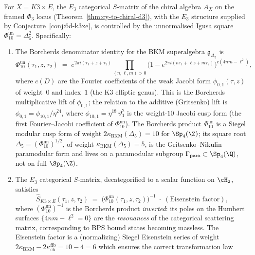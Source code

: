 \begin{conjecture}
\label{conj:s-matrix-phi10}
\ClaimStatusConjectured
For $X = K3 \times E$, the $E_3$ categorical $S$-matrix of the
chiral algebra $A_X$ on the framed $\Phi_3$ locus
\textup{(}Theorem~\textup{\ref{thm:cy-to-chiral-d3}}\textup{)}, with
the $E_3$ structure supplied by Conjecture~\textup{\ref{conj:6d-k3xe}},
is controlled by the
unnormalised Igusa square $\Phi_{10}^{\mathrm{un}}=\Delta_5^2$.
Specifically:
\begin{enumerate}[label=\textup{(\roman*)}]
 \item The Borcherds denominator identity for the BKM superalgebra
 $\mathfrak{g}_{\Delta_5}$ is
 \[
 \Phi_{10}^{\mathrm{un}}(\tau_1, z, \tau_2)
 \;=\;
 e^{2\pi i(\tau_1 + z + \tau_2)}
 \prod_{(n,\ell,m) > 0}
 \bigl(1 - e^{2\pi i(n\tau_1 + \ell z + m\tau_2)}\bigr)^{c(4nm - \ell^2)},
 \]
 where $c(D)$ are the Fourier coefficients of the weak Jacobi
 form $\phi_{0,1}(\tau,z)$ of weight~$0$ and index~$1$
 (the K3 elliptic genus). This is the Borcherds multiplicative
 lift of $\phi_{0,1}$; the relation to the additive
 (Gritsenko) lift is $\phi_{0,1} = \phi_{10,1} / \eta^{24}$,
 where $\phi_{10,1} = \eta^{18}\,\vartheta_1^2$ is the weight-$10$
 Jacobi cusp form (the first Fourier--Jacobi coefficient of
 $\Phi_{10}^{\mathrm{un}}$). The Borcherds product
 $\Phi_{10}^{\mathrm{un}}$ is a Siegel
 modular cusp form of weight $2\kappa_{\mathrm{BKM}}(\Delta_5) = 10$ for
 $\Sp_4(\Z)$; its square root
 $\Delta_5 = (\Phi_{10}^{\mathrm{un}})^{1/2}$, of
 weight $\kappa_{\mathrm{BKM}}(\Delta_5) = 5$, is the Gritsenko--Nikulin
 paramodular form and lives on a paramodular subgroup
 $\Gamma_{\mathrm{para}} \subset \Sp_4(\Q)$, not on full $\Sp_4(\Z)$.
 \item The $E_3$ categorical $S$-matrix, decategorified to a scalar
 function on $\cH_2$, satisfies
 \[
 \hat{S}_{K3 \times E}(\tau_1, z, \tau_2)
 \;=\;
 \bigl(\Phi_{10}^{\mathrm{un}}(\tau_1, z, \tau_2)\bigr)^{-1}
 \;\cdot\; (\text{Eisenstein factor}),
 \]
 where $(\Phi_{10}^{\mathrm{un}})^{-1}$ is the Borcherds product
 \emph{inverted}: its poles on the Humbert surfaces
 $\{4n m - \ell^2 = 0\}$ are the \emph{resonances} of the
 categorical scattering matrix, corresponding to BPS bound
 states becoming massless. The Eisenstein factor is a
 (normalizing) Siegel Eisenstein series of weight
 $2\kappa_{\mathrm{BKM}} - 2\kappa_{\mathrm{ch}}^{\mathrm{fib}}
 = 10 - 4 = 6$
 which ensures the correct transformation law

\end{enumerate}
\end{conjecture}
